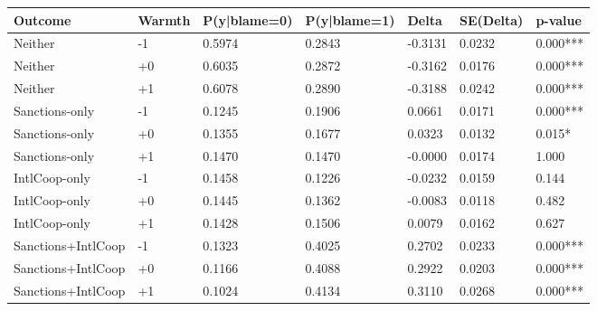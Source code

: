 
\begin{tabular}[t]{lllllll}
\toprule
Outcome & Warmth & P(y|blame=0) & P(y|blame=1) & Delta & SE(Delta) & p-value\\
\midrule
Neither & -1 & 0.5974 & 0.2843 & -0.3131 & 0.0232 & 0.000***\\
Neither & +0 & 0.6035 & 0.2872 & -0.3162 & 0.0176 & 0.000***\\
Neither & +1 & 0.6078 & 0.2890 & -0.3188 & 0.0242 & 0.000***\\
Sanctions-only & -1 & 0.1245 & 0.1906 & 0.0661 & 0.0171 & 0.000***\\
Sanctions-only & +0 & 0.1355 & 0.1677 & 0.0323 & 0.0132 & 0.015*\\
Sanctions-only & +1 & 0.1470 & 0.1470 & -0.0000 & 0.0174 & 1.000\\
IntlCoop-only & -1 & 0.1458 & 0.1226 & -0.0232 & 0.0159 & 0.144\\
IntlCoop-only & +0 & 0.1445 & 0.1362 & -0.0083 & 0.0118 & 0.482\\
IntlCoop-only & +1 & 0.1428 & 0.1506 & 0.0079 & 0.0162 & 0.627\\
Sanctions+IntlCoop & -1 & 0.1323 & 0.4025 & 0.2702 & 0.0233 & 0.000***\\
Sanctions+IntlCoop & +0 & 0.1166 & 0.4088 & 0.2922 & 0.0203 & 0.000***\\
Sanctions+IntlCoop & +1 & 0.1024 & 0.4134 & 0.3110 & 0.0268 & 0.000***\\
\bottomrule
\end{tabular}
